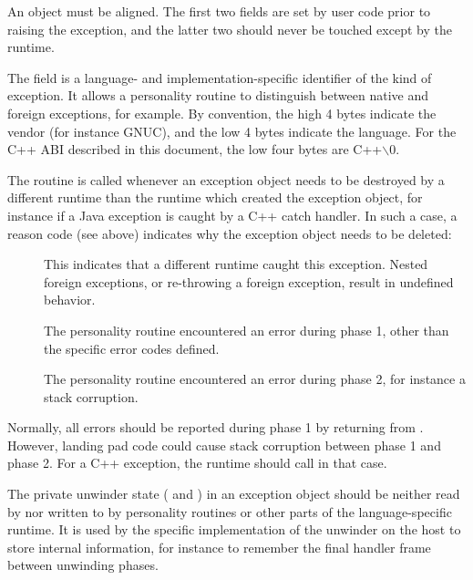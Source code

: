 An  object must be \eightbyte aligned.  The first
two fields are set by user code prior to raising the exception, and the
latter two should never be touched except by the runtime.

The  field is a language- and implementation-specific
identifier of the kind of exception. It allows a personality routine
to distinguish between native and foreign exceptions, for example.
By convention, the high 4 bytes indicate the vendor (for instance
GNUC), and the low 4 bytes indicate the language.  For the C++
ABI described in this document, the low four bytes are C++$\backslash$0.

The  routine is called whenever an exception object
needs to be destroyed by a different runtime than the runtime
which created the exception object, for instance if a Java exception
is caught by a C++ catch handler. In such a case, a reason code (see
above) indicates why the exception object needs to be deleted:

\begin{description}
\item[] This indicates that a
     different runtime caught this exception. Nested foreign exceptions,
     or re-throwing a foreign exception, result in undefined behavior.

\item[] The personality routine encountered
     an error during phase 1, other than the specific error codes defined.

\item[] The personality routine
  encountered an error during phase 2, for instance a stack corruption.
\end{description}

Normally, all errors should be reported during phase 1 by returning
from . However, landing pad code could cause
stack corruption between phase 1 and phase 2. For a C++ exception,
the runtime should call  in that case.

The private unwinder state ( and ) in an exception
object should be neither read by nor written to by personality routines or
other parts of the language-specific runtime.  It is used by the specific
implementation of the unwinder on the host to store internal information,
for instance to remember the final handler frame between unwinding phases.

